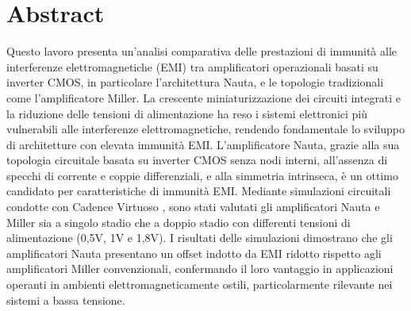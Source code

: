 \thispagestyle{empty} %
\chapter*{Abstract}
\label{ch: Abstract}
Questo lavoro presenta un'analisi comparativa delle prestazioni di immunità alle interferenze elettromagnetiche (EMI) tra amplificatori operazionali basati su inverter CMOS, in particolare l'architettura Nauta, e le topologie tradizionali come l'amplificatore Miller. La crescente miniaturizzazione dei circuiti integrati e la riduzione delle tensioni di alimentazione ha reso i sistemi elettronici più vulnerabili alle interferenze elettromagnetiche, rendendo fondamentale lo sviluppo di architetture con elevata immunità EMI. L'amplificatore Nauta, grazie alla sua topologia circuitale basata su inverter CMOS senza nodi interni, all'assenza di specchi di corrente e coppie differenziali, e alla simmetria intrinseca, è un ottimo candidato per caratteristiche di immunità EMI. Mediante simulazioni circuitali condotte con Cadence Virtuoso \textcopyright, sono stati valutati gli amplificatori Nauta e Miller sia a singolo stadio che a doppio stadio con differenti tensioni di alimentazione (0,5V, 1V e 1,8V). I risultati delle simulazioni dimostrano che gli amplificatori Nauta presentano un offset indotto da EMI ridotto rispetto agli amplificatori Miller convenzionali, confermando il loro vantaggio in applicazioni operanti in ambienti elettromagneticamente ostili, particolarmente rilevante nei sistemi a bassa tensione.

